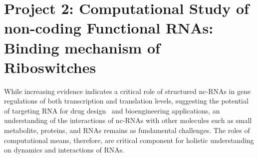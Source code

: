 \documentclass[a4paper,10pt]{article}
\newcommand{\dctfnsp}{dC$_{25}$}
\newcommand{\atfnsp}{A$_{25}$}
\newcommand{\dconsp}{dC$_{1}$}
\newcommand{\aonsp}{A$_{1}$}
\newcommand{\ahl}{$\alpha$HL }
\begin{document}

\section*{Project 2: Computational Study of non-coding Functional RNAs: Binding mechanism of Riboswitches}


While increasing evidence indicates a critical role of structured nc-RNAs in gene regulations of both transcription and translation levels, suggesting the potential of targeting RNA for drug design~\cite{foloppe} and bioengineering applications, an understanding of the interactions of nc-RNAs with other molecules such as small metabolite, proteins, and RNAs remains as fundamental challenges.  The roles of computational means, therefore, are critical component for holistic understanding on dynamics and interactions of RNAs.
\end{document}
